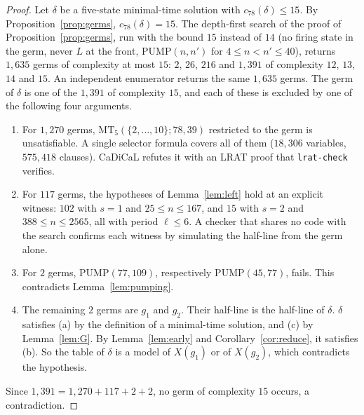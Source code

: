 \begin{proof}
Let $\delta$ be a five-state minimal-time solution with $c_{78}(\delta)\le 15$. By
Proposition~\ref{prop:germs}, $c_{78}(\delta)=15$. The depth-first search of the proof of
Proposition~\ref{prop:germs}, run with the bound $15$ instead of $14$ (no firing state in the germ, never $L$ at
the front, $\mathrm{PUMP}(n,n')$ for $4\le n<n'\le 40$), returns $1{,}635$ germs of complexity at most $15$:
$2$, $26$, $216$ and $1{,}391$ of complexity $12$, $13$, $14$ and $15$. An independent enumerator returns the
same $1{,}635$ germs. The germ of $\delta$ is one of the $1{,}391$ of complexity $15$, and each of these is
excluded by one of the following four arguments.
\begin{enumerate}
  \item[(i)] For $1{,}270$ germs, $\mathrm{MT}_5(\{2,\dots,10\};78,39)$ restricted to the germ is
        unsatisfiable. A single selector formula covers all of them ($18{,}306$ variables, $575{,}418$
        clauses). CaDiCaL refutes it with an LRAT proof that \texttt{lrat-check} verifies.
  \item[(ii)] For $117$ germs, the hypotheses of Lemma~\ref{lem:left} hold at an explicit witness:
        $102$ with $s=1$ and $25\le n\le 167$, and $15$ with $s=2$ and $388\le n\le 2565$, all with
        period $\ell\le 6$. A checker that shares no code with the search confirms each witness by
        simulating the half-line from the germ alone.
  \item[(iii)] For $2$ germs, $\mathrm{PUMP}(77,109)$, respectively $\mathrm{PUMP}(45,77)$, fails. This
        contradicts Lemma~\ref{lem:pumping}.
  \item[(iv)] The remaining $2$ germs are $g_1$ and $g_2$. Their half-line is the half-line of $\delta$.
        $\delta$ satisfies (a) by the definition of a minimal-time solution, and (c) by
        Lemma~\ref{lem:G}. By Lemma~\ref{lem:early} and
        Corollary~\ref{cor:reduce}, it satisfies (b). So the table of $\delta$ is a model of $X(g_1)$ or
        of $X(g_2)$, which contradicts the hypothesis.
\end{enumerate}
Since $1{,}391=1{,}270+117+2+2$, no germ of complexity $15$ occurs, a contradiction.
\end{proof}
